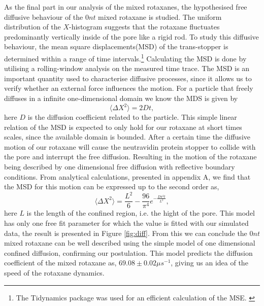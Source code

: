 As the final part in our analysis of the mixed rotaxanes, the hypothesised free diffusive
behaviour of the $0nt$ mixed rotaxane is studied. The uniform distribution of the
$X$-histogram suggests that the rotaxane fluctuates predominantly vertically inside of
the pore like a rigid rod.  To study this diffusive behaviour, the mean square
displacements(MSD) of the trans-stopper is determined within a range of time
intervals.\footnote{The Tidynamics package was used for an efficient calculation of the
MSE. \cite{deBuyl2018}}
Calculating the MSD is done by utilising a rolling-window
analysis on the measured time trace. The MSD is an important quantity used to
characterise diffusive processes, since it allows us to verify whether an external force
influences the motion. For a particle that freely diffuses in a infinite one-dimensional
domain we know the MDS is given by
\begin{equation}
  \langle \Delta X^2 \rangle = 2 D t,
\end{equation}
here $D$ is the diffusion coefficient related to the particle. This simple linear
relation of the MSD is expected to only hold for our rotaxane at short times scales,
since the available domain is bounded. After a certain time the diffusive
motion of our rotaxane will cause the neutravidin protein stopper to collide with the
pore and interrupt the free diffusion. Resulting in the motion of the rotaxane being
described by one dimensional free diffusion with reflective boundary conditions.
From analytical calculations, presented in appendix A, we find
that the MSD for this motion can be expressed up to the second order as,
\begin{equation}
\langle \Delta X^2 \rangle = \frac{L^2}{6} - \frac{96}{\pi^4} e^{-\frac{D \pi^2t
}{L^2}},
\end{equation}
here $L$ is the length of the confined region, i.e. the hight of the pore. This model has
only one free fit parameter for which the value is fitted with our simulated data, the
result is presented in Figure \ref{fig:diff}.  From this we can conclude the $0nt$ mixed
rotaxane can be well described using the simple model of one dimensional confined
diffusion, confirming our postulation. This model predicts the diffusion coefficient of
the mixed rotaxane as, $69.08 \pm 0.02 \mu s^{-1}$, giving us an idea of the speed of the
rotaxane dynamics.

